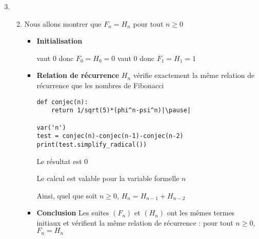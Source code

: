 \begin{frame}[fragile]

\begin{enumerate}\setcounter{enumi}{2}
  \item 
  \begin{enumerate}\setcounter{enumii}{1}
    \item Nous allons montrer que $F_n=H_n$ pour tout $n\ge0$
    \pause
    \begin{itemize}
      \item \textbf{Initialisation}
      
       vaut $0$ donc $F_0=H_0=0$
       vaut $0$ donc $F_1=H_1=1$
     
     \pause
      \item \textbf{Relation de récurrence}
      $H_n$ vérifie exactement la même relation de récurrence que les nombres de Fibonacci
      
      \pause
\begin{algo}
\begin{lstlisting}
def conjec(n):
    return 1/sqrt(5)*(phi^n-psi^n)|\pause| 

var('n')
test = conjec(n)-conjec(n-1)-conjec(n-2)
print(test.simplify_radical())
\end{lstlisting}
\end{algo}      
     
      \pause
      Le résultat est $0$
      
      \pause
      Le calcul est valable pour la variable formelle $n$
      
      \pause
      Ainsi, quel que soit $n\ge0$, $H_n=H_{n-1}+H_{n-2}$
     
      \pause
      \item \textbf{Conclusion} 
      Les suites $(F_n)$ et $(H_n)$ ont les mêmes termes initiaux et 
      vérifient la même relation de récurrence :
      pour tout $n\ge0$, $F_n=H_n$
      
      
    \end{itemize}

  \end{enumerate}
  
\end{enumerate}
\end{frame}




